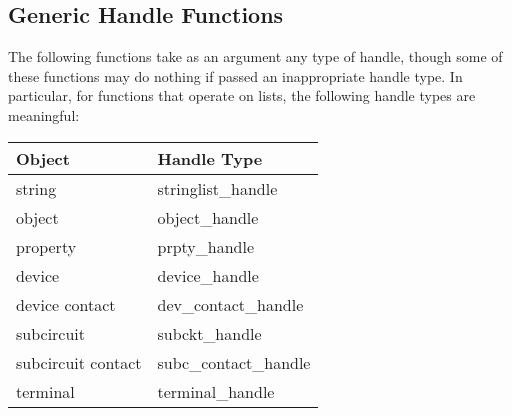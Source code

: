 \subsection{Generic Handle Functions}

The following functions take as an argument any type of handle, though
some of these functions may do nothing if passed an inappropriate
handle type.  In particular, for functions that operate on lists, the
following handle types are meaningful:

\begin{tabular}{|l|l|}\hline
\bf Object & \bf Handle Type\\ \hline
string &  stringlist\_handle\\ \hline
object &  object\_handle\\ \hline
property &  prpty\_handle\\ \hline
device &  device\_handle\\ \hline
device contact &  dev\_contact\_handle\\ \hline
subcircuit &  subckt\_handle\\ \hline
subcircuit contact &  subc\_contact\_handle\\ \hline
terminal &  terminal\_handle\\ \hline
\end{tabular}

